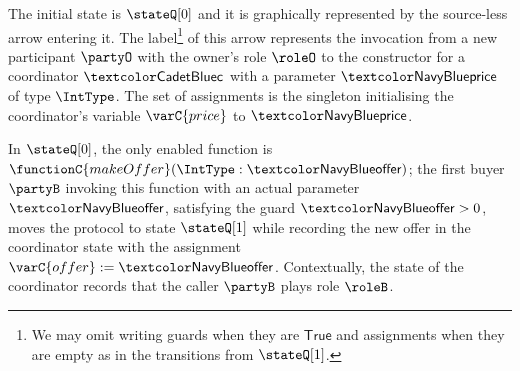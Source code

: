 \begin{example}
  \begin{center}
  \end{center}
  The initial state is $\stateQ[0]$ and it is graphically represented
  by the source-less arrow entering it.
  The label\footnote{%
	We may omit writing guards when they are $\mathsf{True}$ and
	assignments when they are empty as in the transitions from $\stateQ[1]$.
  } of this arrow represents the invocation from a new participant
  $\partyO$ with the owner's role $\roleO$ to the constructor for a
  coordinator $\contractC$ with a parameter $\var{price}$ of type
  $\IntType$.
  The set of assignments is the singleton initialising the coordinator's variable $\varC{price}$ to $\var{price}$.
  
  In $\stateQ[0]$, the only enabled function is
  $\functionC{makeOffer}(\IntType:\var{offer})$; the first buyer
  $\partyB$ invoking this function with an actual parameter $\var{offer}$, satisfying the guard $\var{offer} > 0$, moves the protocol to state $\stateQ[1]$ while recording the new offer in the coordinator state with the assignment
  $\varC{offer} := \var{offer}$.
  Contextually, the state of the coordinator records that the caller $\partyB$ plays role $\roleB$.


\end{example}
